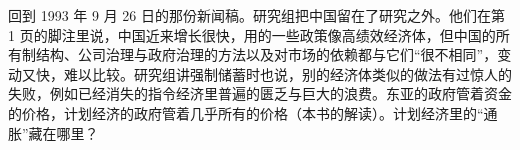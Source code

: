 回到 1993 年 9 月 26 日的那份新闻稿。研究组把中国留在了研究之外\cite{worldbank1993}。他们在第 1 页的脚注里说，中国近来增长很快，用的一些政策像高绩效经济体，但中国的所有制结构、公司治理与政府治理的方法以及对市场的依赖都与它们“很不相同”，变动又快，难以比较\cite{worldbank1993}。研究组讲强制储蓄时也说，别的经济体类似的做法有过惊人的失败，例如已经消失的指令经济里普遍的匮乏与巨大的浪费\cite{worldbank1993}。东亚的政府管着资金的价格，计划经济的政府管着几乎所有的价格（本书的解读）。计划经济里的“通胀”藏在哪里？
